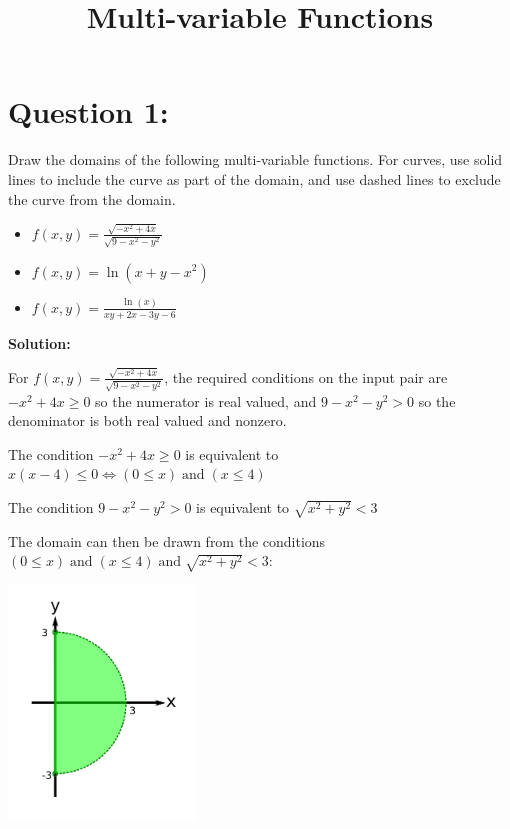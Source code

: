 \documentclass{article}
\title{Multi-variable Functions}
\date{}
\newcommand{\dr}[1]{\textcolor{dark_red}{#1}}
\begin{document}
\maketitle



\section*{Question 1:}

Draw the domains of the following multi-variable functions. For curves, use solid lines to include the curve as part of the domain, and use dashed lines to exclude the curve from the domain.

\begin{itemize}
\item \(f(x,y) = \frac{\sqrt{-x^2 + 4x}}{\sqrt{9 - x^2 - y^2}}\)
\item \(f(x,y) = \ln(x + y - x^2)\)
\item \(f(x,y) = \frac{\ln(x)}{xy + 2x - 3y - 6}\)
\end{itemize}

\vspace{0.5cm}

\dr{\bf Solution:}

\vspace{0.5cm}

\dr{For \(f(x,y) = \frac{\sqrt{-x^2 + 4x}}{\sqrt{9 - x^2 - y^2}}\), the required conditions on the input pair are \(-x^2 + 4x \geq 0\) so the numerator is real valued, and \(9 - x^2 - y^2 > 0\) so the denominator is both real valued and nonzero.}

\dr{The condition \(-x^2 + 4x \geq 0\) is equivalent to \(x(x-4) \leq 0 \iff (0 \leq x) \;\text{and}\; (x \leq 4)\)} 

\dr{The condition \(9 - x^2 - y^2 > 0\) is equivalent to \(\sqrt{x^2 + y^2} < 3\)}

\dr{The domain can then be drawn from the conditions \((0 \leq x) \;\text{and}\; (x \leq 4) \;\text{and}\; \sqrt{x^2 + y^2} < 3\):}

\includegraphics[width = 5cm]{Test_bench_part_2b_images/Question_1_part_1}
\end{document}
